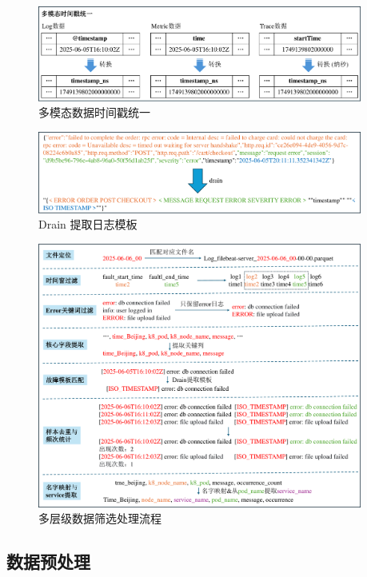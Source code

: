 \documentclass[11pt]{article}
\begin{document}
\begin{figure}[htbp]
    \centering
    \includegraphics[width=0.95\textwidth]{pics/fig4.pdf}
    \caption{多模态数据时间戳统一}
    \label{fig4}
\end{figure}

\begin{figure}[htbp]
    \centering
    \includegraphics[width=0.95\textwidth]{pics/fig5.pdf}
    \caption{Drain 提取日志模板}
    \label{fig5}
\end{figure}

\begin{figure}[htbp]
    \centering
    \includegraphics[width=0.95\textwidth]{pics/fig6.pdf}
    \caption{多层级数据筛选处理流程}
    \label{fig6}
\end{figure}

\subsection{数据预处理}
\label{sec:data-preprocess}
\end{document}
